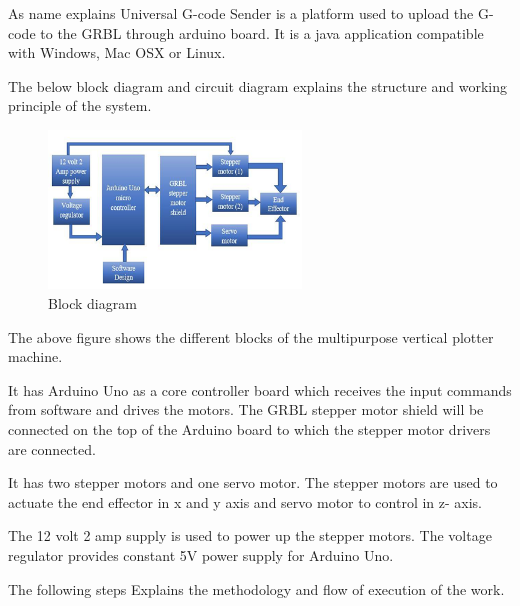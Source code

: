 \documentclass[conference]{IEEEtran}
\begin{document}
As name explains Universal G-code Sender is a platform used
to upload the G-code to the GRBL through arduino board. It is
a java application compatible with Windows, Mac OSX or
Linux.
\vspace{5pt}

The below block diagram and circuit diagram explains the
structure and working principle of the system.

\vspace{50pt}



\begin{figure}[t]
    \centering
    \includegraphics[width=0.60\textwidth]{block.png}
    \caption{Block diagram}
\end{figure}

The above figure shows the different blocks of the
multipurpose vertical plotter machine.

\vspace{5pt}
It has Arduino Uno as a core controller board which receives
the input commands from software and drives the motors. The
GRBL stepper motor shield will be connected on the top of the
Arduino board to which the stepper motor drivers are
connected.


\vspace{5pt}

It has two stepper motors and one servo motor. The stepper
motors are used to actuate the end effector in x and y axis and
servo motor to control in z- axis.

\vspace{5pt}


The 12 volt 2 amp supply is used to power up the stepper
motors. The voltage regulator provides constant 5V power
supply for Arduino Uno.

\vspace{5pt}

The following steps Explains the methodology and flow of
execution of the work.


\vspace{5pt}
\end{document}
